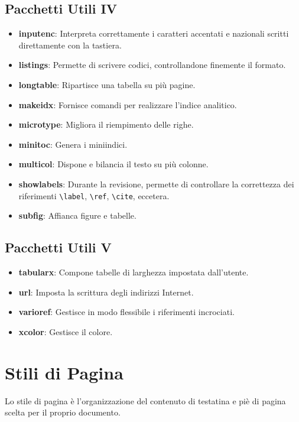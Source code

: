 \documentclass{report}
\begin{document}
            \subsection{Pacchetti Utili IV}
                \begin{itemize}
                    \item \textbf{inputenc}: Interpreta correttamente i caratteri accentati e nazionali scritti direttamente con la tastiera.
                    \item \textbf{listings}: Permette di scrivere codici, controllandone finemente il formato.
                    \item \textbf{longtable}: Ripartisce una tabella su più pagine.
                    \item \textbf{makeidx}: Fornisce comandi per realizzare l'indice analitico.
                    \item \textbf{microtype}: Migliora il riempimento delle righe.
                    \item \textbf{minitoc}: Genera i miniindici.
                    \item \textbf{multicol}: Dispone e bilancia il testo su più colonne.
                    \item \textbf{showlabels}: Durante la revisione, permette di controllare la correttezza dei riferimenti \verb!\label!, \verb!\ref!, \verb!\cite!, eccetera.
                    \item \textbf{subfig}: Affianca figure e tabelle.
                \end{itemize}

            \subsection{Pacchetti Utili V}
                \begin{itemize}
                    \item \textbf{tabularx}: Compone tabelle di larghezza impostata dall'utente.
                    \item \textbf{url}: Imposta la scrittura degli indirizzi Internet.
                    \item \textbf{varioref}: Gestisce in modo flessibile i riferimenti incrociati.
                    \item \textbf{xcolor}: Gestisce il colore.
                \end{itemize}
            
        \section{Stili di Pagina}
            Lo stile di pagina è l'organizzazione del contenuto di testatina e piè di pagina scelta per il proprio documento. \\
\end{document}
